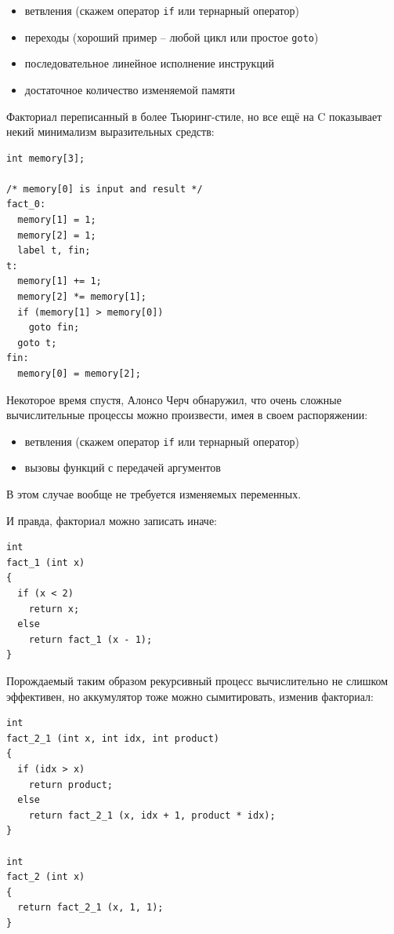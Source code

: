 \documentclass[a4paper,12pt,oneside]{article}
\begin{document}
\begin{itemize}
\item ветвления (скажем оператор \lstinline!if! или тернарный оператор)
\item переходы (хороший пример -- любой цикл или простое \lstinline!goto!)
\item последовательное линейное исполнение инструкций
\item достаточное количество изменяемой памяти
\end{itemize}

Факториал переписанный в более Тьюринг-стиле, но все ещё на C показывает некий минимализм выразительных средств:

\begin{lstlisting}
int memory[3];

/* memory[0] is input and result */
fact_0:
  memory[1] = 1;
  memory[2] = 1;
  label t, fin;
t:
  memory[1] += 1;
  memory[2] *= memory[1];
  if (memory[1] > memory[0]) 
    goto fin;
  goto t;
fin:
  memory[0] = memory[2];
\end{lstlisting}

Некоторое время спустя, Алонсо Черч обнаружил, что очень сложные вычислительные процессы можно произвести, имея в своем распоряжении:

\begin{itemize}
\item ветвления (скажем оператор \lstinline!if! или тернарный оператор)
\item вызовы функций с передачей аргументов
\end{itemize}

В этом случае вообще не требуется изменяемых переменных.

И правда, факториал можно записать иначе:

\begin{lstlisting}
int
fact_1 (int x)
{
  if (x < 2)
    return x;
  else
    return fact_1 (x - 1);
}
\end{lstlisting}

Порождаемый таким образом рекурсивный процесс вычислительно не слишком эффективен, но аккумулятор тоже можно сымитировать, изменив факториал:

\begin{lstlisting}
int
fact_2_1 (int x, int idx, int product)
{
  if (idx > x)
    return product;
  else
    return fact_2_1 (x, idx + 1, product * idx);
}

int
fact_2 (int x)
{
  return fact_2_1 (x, 1, 1);
}

\end{lstlisting}
\end{document}
